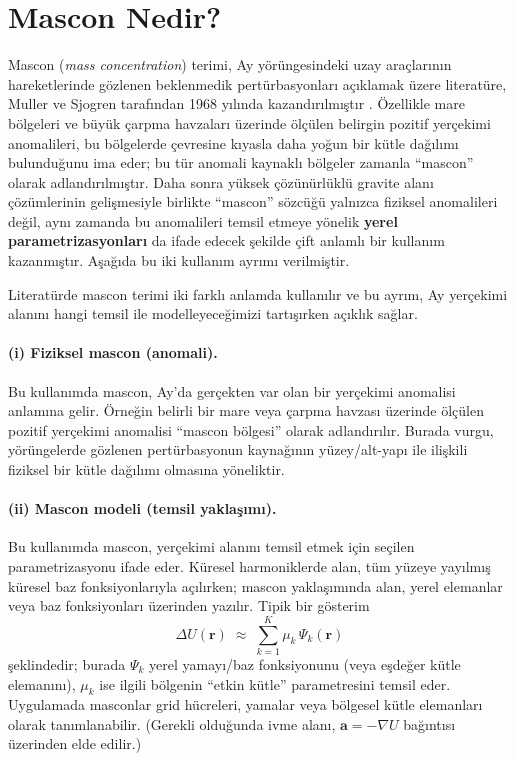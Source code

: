\section{Mascon Nedir?}
\label{sec:mascon_def}

Mascon (\emph{mass concentration}) terimi, Ay yörüngesindeki uzay araçlarının hareketlerinde
gözlenen beklenmedik pertürbasyonları açıklamak üzere literatüre, Muller ve Sjogren tarafından
1968 yılında kazandırılmıştır \cite{Muller1968}. Özellikle mare bölgeleri ve büyük çarpma havzaları
üzerinde ölçülen belirgin pozitif yerçekimi anomalileri, bu bölgelerde çevresine kıyasla daha yoğun
bir kütle dağılımı bulunduğunu ima eder; bu tür anomali kaynaklı bölgeler zamanla ``mascon'' olarak
adlandırılmıştır. Daha sonra yüksek çözünürlüklü gravite alanı çözümlerinin gelişmesiyle birlikte
``mascon'' sözcüğü yalnızca fiziksel anomalileri değil, aynı zamanda bu anomalileri temsil etmeye
yönelik \textbf{yerel parametrizasyonları} da ifade edecek şekilde çift anlamlı bir kullanım kazanmıştır.
Aşağıda bu iki kullanım ayrımı verilmiştir.

Literatürde mascon terimi iki farklı anlamda kullanılır ve bu ayrım, Ay yerçekimi alanını hangi temsil
ile modelleyeceğimizi tartışırken açıklık sağlar.

\paragraph{(i) Fiziksel mascon (anomali).}
Bu kullanımda mascon, Ay'da gerçekten var olan bir yerçekimi anomalisi anlamına gelir. Örneğin belirli bir mare
veya çarpma havzası üzerinde ölçülen pozitif yerçekimi anomalisi ``mascon bölgesi'' olarak adlandırılır.
Burada vurgu, yörüngelerde gözlenen pertürbasyonun kaynağının yüzey/alt-yapı ile ilişkili fiziksel bir kütle
dağılımı olmasına yöneliktir.

\paragraph{(ii) Mascon modeli (temsil yaklaşımı).}
Bu kullanımda mascon, yerçekimi alanını temsil etmek için seçilen parametrizasyonu ifade eder.
Küresel harmoniklerde alan, tüm yüzeye yayılmış küresel baz fonksiyonlarıyla açılırken; mascon yaklaşımında alan,
yerel elemanlar veya baz fonksiyonları üzerinden yazılır. Tipik bir gösterim
\[
\Delta U(\mathbf r)\;\approx\;\sum_{k=1}^{K} \mu_k\,\Psi_k(\mathbf r)
\]
şeklindedir; burada $\Psi_k$ yerel yamayı/baz fonksiyonunu (veya eşdeğer kütle elemanını), $\mu_k$ ise ilgili bölgenin
``etkin kütle'' parametresini temsil eder. Uygulamada masconlar grid hücreleri, yamalar veya bölgesel kütle elemanları
olarak tanımlanabilir. (Gerekli olduğunda ivme alanı, $\mathbf a=-\nabla U$ bağıntısı üzerinden elde edilir.)

